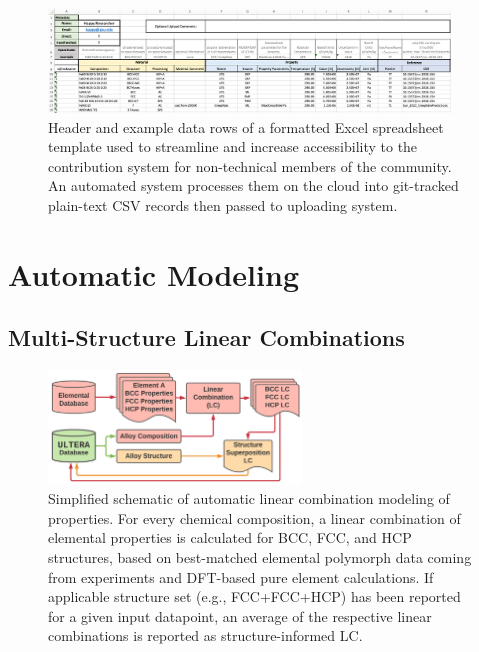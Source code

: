 \todo



\begin{figure}[H]
    \centering
    \includegraphics[width=0.95\textwidth]{ultera/ULTERA_Contribute.png}
    \caption{Header and example data rows of a formatted Excel spreadsheet template used to streamline and increase accessibility to the contribution system for non-technical members of the community. An automated system processes them on the cloud into git-tracked plain-text CSV records then passed to uploading system.}
    \label{ultera:fig:contributiontemplate}
\end{figure}




\section{Automatic Modeling} \label{ultera:sec:}

\subsection{Multi-Structure Linear Combinations} \label{ultera:ssec:autolc}

\begin{figure}[H]
    \centering
    \includegraphics[width=0.6\textwidth]{ultera/ULTERA_ElementalDatabase_LC_V1.png}
    \caption{Simplified schematic of automatic linear combination modeling of properties. For every chemical composition, a linear combination of elemental properties is calculated for BCC, FCC, and HCP structures, based on best-matched elemental polymorph data coming from experiments and DFT-based pure element calculations. If applicable structure set (e.g., FCC+FCC+HCP) has been reported for a given input datapoint, an average of the respective linear combinations is reported as structure-informed LC.}
    \label{ultera:fig:autolc}
\end{figure}




